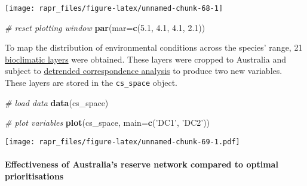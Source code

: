 \documentclass[11pt,]{article}
\newenvironment{Shaded}{\begin{snugshade}}{\end{snugshade}}
\newcommand{\KeywordTok}[1]{\textcolor[rgb]{0.13,0.29,0.53}{\textbf{{#1}}}}
\newcommand{\DataTypeTok}[1]{\textcolor[rgb]{0.13,0.29,0.53}{{#1}}}
\newcommand{\FloatTok}[1]{\textcolor[rgb]{0.00,0.00,0.81}{{#1}}}
\newcommand{\StringTok}[1]{\textcolor[rgb]{0.31,0.60,0.02}{{#1}}}
\newcommand{\CommentTok}[1]{\textcolor[rgb]{0.56,0.35,0.01}{\textit{{#1}}}}
\newcommand{\NormalTok}[1]{{#1}}
\let\origfigure\figure
\let\endorigfigure\endfigure
\renewenvironment{figure}[1][2] {
	\expandafter\origfigure\expandafter[H]
} {
	\endorigfigure
}
\begin{document}
\begin{figure}

{\centering \texttt{[image: rapr\_files/figure-latex/unnamed-chunk-68-1]} 

}

\caption{Planning units for the case-study examples. Yellow polygons represent planning units with more then 50\% of their area already in existing reserves.}\label{fig:unnamed-chunk-68}
\end{figure}

\begin{Shaded}
\begin{Highlighting}[]
\CommentTok{# reset plotting window}
\KeywordTok{par}\NormalTok{(}\DataTypeTok{mar=}\KeywordTok{c}\NormalTok{(}\FloatTok{5.1}\NormalTok{, }\FloatTok{4.1}\NormalTok{, }\FloatTok{4.1}\NormalTok{, }\FloatTok{2.1}\NormalTok{))}
\end{Highlighting}
\end{Shaded}

To map the distribution of environmental conditions across the species'
range, 21 \href{http://www.worldclim.org/bioclim}{bioclimatic layers}
were obtained. These layers were cropped to Australia and subject to
\href{http://cc.oulu.fi/~jarioksa/softhelp/vegan/html/decorana.html}{detrended
correspondence analysis} to produce two new variables. These layers are
stored in the \texttt{cs\_space} object.

\begin{Shaded}
\begin{Highlighting}[]
\CommentTok{# load data}
\KeywordTok{data}\NormalTok{(cs_space)}

\CommentTok{# plot variables}
\KeywordTok{plot}\NormalTok{(cs_space, }\DataTypeTok{main=}\KeywordTok{c}\NormalTok{(}\StringTok{'DC1'}\NormalTok{, }\StringTok{'DC2'}\NormalTok{))}
\end{Highlighting}
\end{Shaded}

\begin{figure}[htbp]
\centering
\texttt{[image: rapr\_files/figure-latex/unnamed-chunk-69-1.pdf]}
\caption{Broad-scale environmental variation across Australia. The
variable DC1 describes the transition from wet and cool to dry and hot
conditions. The variable DC2 describes the transition from wet and hot
to dry and cool conditions.}
\end{figure}

\paragraph{Effectiveness of Australia's reserve network compared to
optimal
prioritisations}\label{effectiveness-of-australias-reserve-network-compared-to-optimal-prioritisations}
\end{document}
